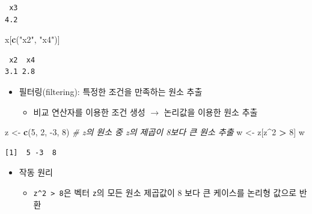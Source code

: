 \documentclass[
  11pt,
]{krantz}
\newenvironment{Shaded}{\begin{snugshade}}{\end{snugshade}}
\newcommand{\CommentTok}[1]{\textcolor[rgb]{0.37,0.37,0.37}{\textit{#1}}}
\newcommand{\DecValTok}[1]{\textcolor[rgb]{0.06,0.06,0.06}{#1}}
\newcommand{\KeywordTok}[1]{\textcolor[rgb]{0.27,0.27,0.27}{\textbf{#1}}}
\newcommand{\NormalTok}[1]{#1}
\newcommand{\OperatorTok}[1]{\textcolor[rgb]{0.43,0.43,0.43}{\textbf{#1}}}
\newcommand{\StringTok}[1]{\textcolor[rgb]{0.5,0.5,0.5}{#1}}
\providecommand{\tightlist}{%
  \setlength{\itemsep}{0pt}\setlength{\parskip}{0pt}}
\begin{document}
\begin{verbatim}
 x3 
4.2 
\end{verbatim}

\begin{Shaded}
\begin{Highlighting}[]
\NormalTok{x[}\KeywordTok{c}\NormalTok{(}\StringTok{"x2"}\NormalTok{, }\StringTok{"x4"}\NormalTok{)]}
\end{Highlighting}
\end{Shaded}

\begin{verbatim}
 x2  x4 
3.1 2.8 
\end{verbatim}

\normalsize

\begin{itemize}
\tightlist
\item
  필터링(filtering): 특정한 조건을 만족하는 원소 추출

  \begin{itemize}
  \tightlist
  \item
    비교 연산자를 이용한 조건 생성 \(\rightarrow\) 논리값을 이용한 원소 추출
  \end{itemize}
\end{itemize}

\footnotesize

\begin{Shaded}
\begin{Highlighting}[]
\NormalTok{z <-}\StringTok{ }\KeywordTok{c}\NormalTok{(}\DecValTok{5}\NormalTok{, }\DecValTok{2}\NormalTok{, }\DecValTok{-3}\NormalTok{, }\DecValTok{8}\NormalTok{)}
\CommentTok{# z의 원소 중 z의 제곱이 8보다 큰 원소 추출}
\NormalTok{w <-}\StringTok{ }\NormalTok{z[z}\OperatorTok{^}\DecValTok{2} \OperatorTok{>}\StringTok{ }\DecValTok{8}\NormalTok{]}
\NormalTok{w}
\end{Highlighting}
\end{Shaded}

\begin{verbatim}
[1]  5 -3  8
\end{verbatim}

\normalsize

\begin{itemize}
\tightlist
\item
  작동 원리

  \begin{itemize}
  \tightlist
  \item
    \texttt{z\^{}2\ \textgreater{}\ 8}은 벡터 \texttt{z}의 모든 원소 제곱값이 8 보다 큰 케이스를 논리형 값으로 반환
  \end{itemize}
\end{itemize}
\end{document}
